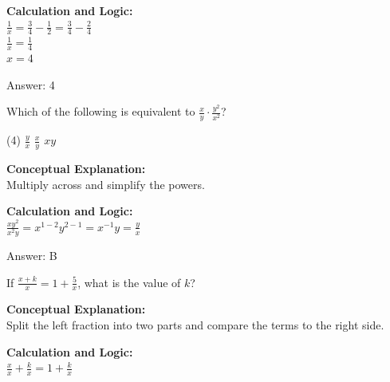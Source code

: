 \documentclass[11pt,paper=a4,answers]{exam}
\begin{document}
\begin{questions}
\begin{solution}
\vspace{20pt}

\textbf{Calculation and Logic:} \\
$\frac{1}{x} = \frac{3}{4} - \frac{1}{2} = \frac{3}{4} - \frac{2}{4}$ \\
$\frac{1}{x} = \frac{1}{4}$ \\
$x = 4$

\vspace{25pt}

Answer: \colorbox{yellow!100}{4}
\end{solution}

\vspace{40pt}

\question
Which of the following is equivalent to $\frac{x}{y} \cdot \frac{y^2}{x^2}$?
\begin{tasks}(4)
    \task $\frac{y}{x}$
    \task $\frac{x}{y}$
    \task $xy$
\end{tasks}

\begin{solution}
\textbf{Conceptual Explanation:} \\
Multiply across and simplify the powers.

\vspace{20pt}

\textbf{Calculation and Logic:} \\
$\frac{xy^2}{x^2y} = x^{1-2}y^{2-1} = x^{-1}y = \frac{y}{x}$

\vspace{25pt}

Answer: \colorbox{yellow!100}{B}
\end{solution}

\vspace{40pt}

\question
If $\frac{x+k}{x} = 1 + \frac{5}{x}$, what is the value of $k$?

\begin{solution}
\textbf{Conceptual Explanation:} \\
Split the left fraction into two parts and compare the terms to the right side.

\vspace{20pt}

\textbf{Calculation and Logic:} \\
$\frac{x}{x} + \frac{k}{x} = 1 + \frac{k}{x}$


\end{solution}
\end{questions}
\end{document}
